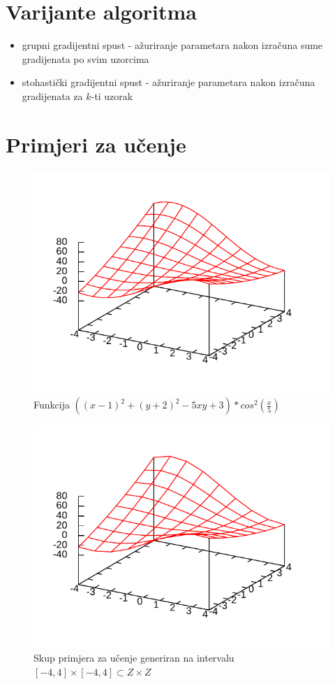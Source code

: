 \documentclass{article}
\begin{document}
\section{Varijante algoritma}

\begin{itemize}
    \item grupni gradijentni spust -
    ažuriranje parametara nakon izračuna sume gradijenata po svim uzorcima
    \item stohastički gradijentni spust -
    ažuriranje parametara nakon izračuna gradijenata za $k$-ti uzorak
\end{itemize}

\section{Primjeri za učenje}

\begin{figure}[h]
    \centering
    \includegraphics{img/dataset-function.pdf}
    \caption{Funkcija $ ((x - 1)^2 + (y + 2)^2 - 5 x y + 3) * cos^2(\frac{x}{5}) $}
\end{figure}

\begin{figure}[h]
    \centering
    \includegraphics{img/dataset-sampled.pdf}
    \caption{Skup primjera za učenje generiran na intervalu $ [-4, 4] \times [-4, 4] \subset Z \times Z $ }
\end{figure}
\end{document}
